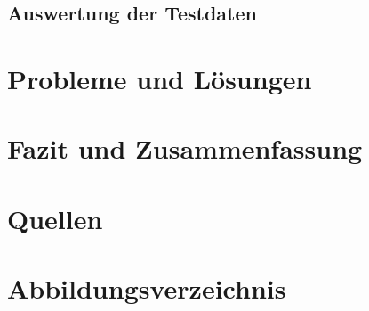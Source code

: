 \documentclass[12pt,a4paper]{scrreprt}
\begin{document}



\newpage
\subsection{Auswertung der Testdaten}


\newpage
\section{Probleme und Lösungen}

\section{Fazit und Zusammenfassung}

\section{Quellen}


\section{Abbildungsverzeichnis}
\listoffigures	
	
\end{document}

